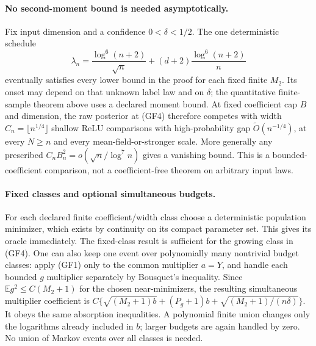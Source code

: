 \paragraph{No second-moment bound is needed asymptotically.}
Fix input dimension and a confidence $0<\delta<1/2$. The one
deterministic schedule
\[
 \lambda_n=\frac{\log^6(n+2)}{\sqrt n}
                  +(d+2)\frac{\log^6(n+2)}n              \tag{GF4}
\]
eventually satisfies every lower bound in the proof for each fixed
finite $M_2$. Its onset may depend on that unknown label law and on
$\delta$; the quantitative finite-sample theorem above uses a
declared moment bound. At fixed coefficient cap $B$ and dimension,
the raw posterior at (GF4) therefore competes with width
$C_n=\lfloor n^{1/4}\rfloor$ shallow ReLU comparisons with
high-probability gap $\widetilde O(n^{-1/4})$, at every $N\ge n$
and every mean-field-or-stronger scale. More generally any prescribed
$C_nB_n^2=o(\sqrt n/\log^7 n)$ gives a vanishing bound. This is a
bounded-coefficient comparison, not a coefficient-free theorem on
arbitrary input laws.

\paragraph{Fixed classes and optional simultaneous budgets.}
For each declared finite coefficient/width class choose a
deterministic population minimizer, which exists by continuity on
its compact parameter set. This gives its oracle immediately.
The fixed-class result is sufficient for the growing class in (GF4).
One can also keep one event over polynomially many nontrivial budget
classes: apply (GF1) only to the common multiplier $a=Y$, and handle
each bounded $g$ multiplier separately by Bousquet's inequality.
Since $\mathbb E g^2\le C(M_2+1)$ for the chosen near-minimizers,
the resulting simultaneous multiplier coefficient is
$C\{\sqrt{(M_2+1)b}+(P_g+1)b+\sqrt{(M_2+1)/(n\delta)}\}$.
It obeys the same absorption inequalities. A polynomial finite union
changes only the logarithms already included in $b$; larger budgets
are again handled by zero. No union of Markov events over all classes
is needed.

